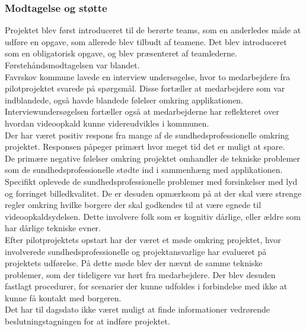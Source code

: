\subsubsection{Modtagelse og støtte}
Projektet blev først introduceret til de berørte teams, som en anderledes måde at udføre en opgave, som allerede blev tilbudt af teamene. Det blev introduceret som en obligatorisk opgave, og blev præsenteret af teamlederne. Førstehåndsmodtagelsen var blandet. \\
Favrskov kommune lavede en interview undersøgelse, hvor to medarbejdere fra pilotprojektet svarede på spørgsmål. Disse fortæller at medarbejdere som var indblandede, også havde blandede følelser omkring applikationen. Interviewundersøgelsen fortæller også at medarbejderne har reflekteret over hvordan videoopkald kunne videreudvikles i kommunen. \\
Der har været positiv respons fra mange af de sundhedsprofessionelle omkring projektet. Responsen påpeger primært hvor meget tid det er muligt at spare. \\
De primære negative følelser omkring projektet omhandler de tekniske problemer som de sundhedsprofessionelle stødte ind i sammenhæng med applikationen. Specifikt oplevede de sundhedsprofessionelle problemer med forsinkelser med lyd og forringet billedkvalitet. De er desuden opmærksom på at der skal være strenge regler omkring hvilke borgere der skal godkendes til at være egnede til videoopkaldsydelsen. Dette involvere folk som er kognitiv dårlige, eller ældre som har dårlige tekniske evner. \\
Efter pilotprojektets opstart har der været et møde omkring projektet, hvor involverede sundhedsprofessionelle og projektansvarlige har evalueret på projektets udførelse. På dette møde blev der nævnt de samme tekniske problemer, som der tideligere var hørt fra medarbejdere. Der blev desuden fastlagt procedurer, for scenarier der kunne udfoldes i forbindelse med ikke at kunne få kontakt med borgeren. \\
Det har til dagsdato ikke været muligt at finde informationer vedrørende beslutningstagningen for at indføre projektet. \\
  
